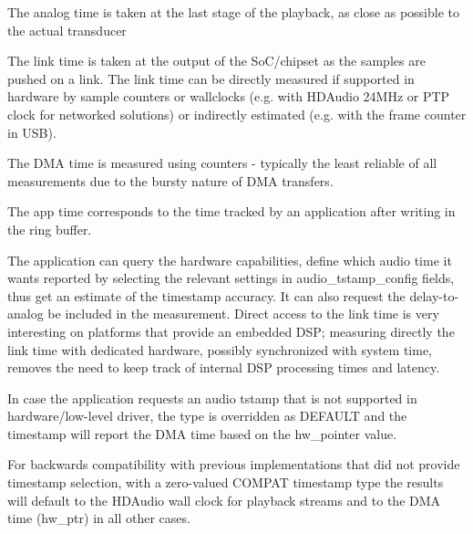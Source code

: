 \documentclass[a4paper,8pt,english]{sphinxmanual}
\begin{document}
The analog time is taken at the last stage of the playback, as close
as possible to the actual transducer

The link time is taken at the output of the SoC/chipset as the samples
are pushed on a link. The link time can be directly measured if
supported in hardware by sample counters or wallclocks (e.g. with
HDAudio 24MHz or PTP clock for networked solutions) or indirectly
estimated (e.g. with the frame counter in USB).

The DMA time is measured using counters - typically the least reliable
of all measurements due to the bursty nature of DMA transfers.

The app time corresponds to the time tracked by an application after
writing in the ring buffer.

The application can query the hardware capabilities, define which
audio time it wants reported by selecting the relevant settings in
audio\_tstamp\_config fields, thus get an estimate of the timestamp
accuracy. It can also request the delay-to-analog be included in the
measurement. Direct access to the link time is very interesting on
platforms that provide an embedded DSP; measuring directly the link
time with dedicated hardware, possibly synchronized with system time,
removes the need to keep track of internal DSP processing times and
latency.

In case the application requests an audio tstamp that is not supported
in hardware/low-level driver, the type is overridden as DEFAULT and the
timestamp will report the DMA time based on the hw\_pointer value.

For backwards compatibility with previous implementations that did not
provide timestamp selection, with a zero-valued COMPAT timestamp type
the results will default to the HDAudio wall clock for playback
streams and to the DMA time (hw\_ptr) in all other cases.
\end{document}
